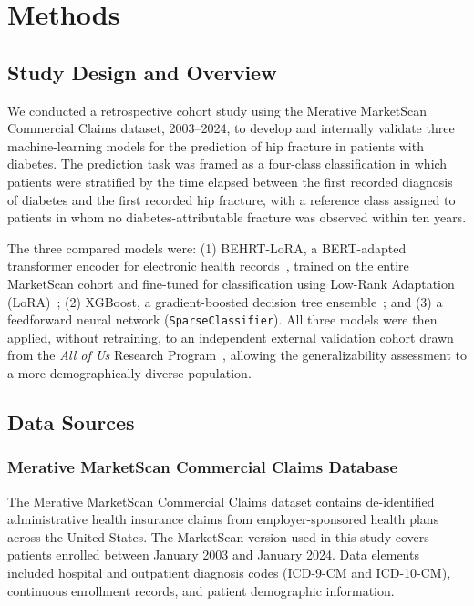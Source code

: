 \documentclass[12pt]{article}
\begin{document}
\section{Methods}

\subsection{Study Design and Overview}

We conducted a retrospective cohort study using the Merative MarketScan Commercial Claims dataset, 2003--2024, to develop and internally validate three machine-learning models for the prediction of hip fracture in patients with diabetes. The prediction task was framed as a four-class classification in which patients were stratified by the time elapsed between the first recorded diagnosis of diabetes and the first recorded hip fracture, with a reference class assigned to patients in whom no diabetes-attributable fracture was observed within ten years.

The three compared models were: (1) BEHRT-LoRA, a BERT-adapted transformer encoder for electronic health records~\citep{Devlin2019BERT,Li2020BEHRT}, trained on the entire MarketScan cohort and fine-tuned for classification using Low-Rank Adaptation (LoRA)~\citep{Hu2022LoRA}; (2) XGBoost, a gradient-boosted decision tree ensemble~\citep{Chen2016XGBoost}; and (3) a feedforward neural network (\texttt{SparseClassifier}). All three models were then applied, without retraining, to an independent external validation cohort drawn from the \textit{All of Us} Research Program~\citep{AllofUs2019NEJM}, allowing the generalizability assessment to a more demographically diverse population.

\subsection{Data Sources}

\subsubsection{Merative MarketScan Commercial Claims Database}

The Merative MarketScan Commercial Claims dataset contains de-identified administrative health insurance claims from employer-sponsored health plans across the United States. The MarketScan version used in this study covers patients enrolled between January 2003 and January 2024. Data elements included hospital and outpatient diagnosis codes (ICD-9-CM and ICD-10-CM), continuous enrollment records, and patient demographic information.
\end{document}
